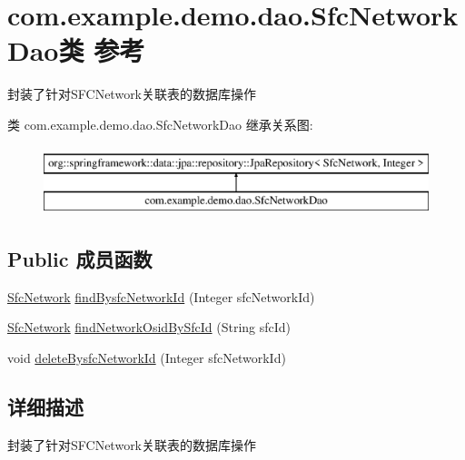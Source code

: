 \hypertarget{interfacecom_1_1example_1_1demo_1_1dao_1_1_sfc_network_dao}{}\section{com.\+example.\+demo.\+dao.\+Sfc\+Network\+Dao类 参考}
\label{interfacecom_1_1example_1_1demo_1_1dao_1_1_sfc_network_dao}


封装了针对\+S\+F\+C\+Network关联表的数据库操作  


类 com.\+example.\+demo.\+dao.\+Sfc\+Network\+Dao 继承关系图\+:\begin{figure}[H]
\begin{center}
\leavevmode
\includegraphics[height=2.000000cm]{interfacecom_1_1example_1_1demo_1_1dao_1_1_sfc_network_dao}
\end{center}
\end{figure}
\subsection*{Public 成员函数}
\begin{DoxyCompactItemize}
\item 
\mbox{\hyperlink{classcom_1_1example_1_1demo_1_1modular_1_1_sfc_network}{Sfc\+Network}} \mbox{\hyperlink{interfacecom_1_1example_1_1demo_1_1dao_1_1_sfc_network_dao_a7e9d82772c6f1ccb623c4eec9016f8c5}{find\+Bysfc\+Network\+Id}} (Integer sfc\+Network\+Id)
\item 
\mbox{\hyperlink{classcom_1_1example_1_1demo_1_1modular_1_1_sfc_network}{Sfc\+Network}} \mbox{\hyperlink{interfacecom_1_1example_1_1demo_1_1dao_1_1_sfc_network_dao_a9f66e6bad7f7a606f0ca8da2a907e0db}{find\+Network\+Osid\+By\+Sfc\+Id}} (String sfc\+Id)
\item 
void \mbox{\hyperlink{interfacecom_1_1example_1_1demo_1_1dao_1_1_sfc_network_dao_a3139d28b6dd4dee9aa7b938057088ae2}{delete\+Bysfc\+Network\+Id}} (Integer sfc\+Network\+Id)
\end{DoxyCompactItemize}


\subsection{详细描述}
封装了针对\+S\+F\+C\+Network关联表的数据库操作 

